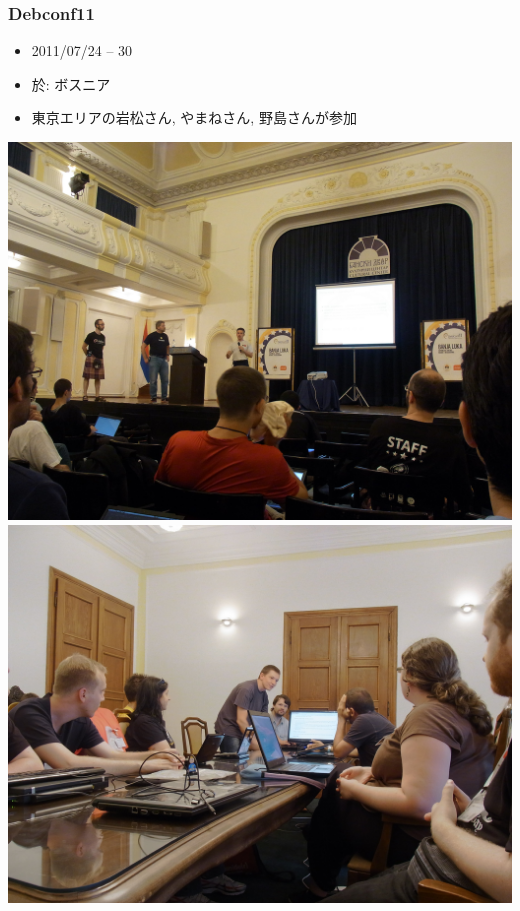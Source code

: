 \documentclass[cjk,dvipdfmx,12pt,%
hyperref={bookmarks=true,bookmarksnumbered=true,bookmarksopen=false,%
colorlinks=false,%
pdftitle={第 50 回 関西 Debian 勉強会},%
pdfauthor={倉敷・のがた・佐々木},%
pdfsubject={資料},%
}]{beamer}
\begin{document}
\begin{frame}[fragile]
  \frametitle{Debconf11}
  \begin{itemize}
  \item 2011/07/24 -- 30
  \item 於: ボスニア
  \item 東京エリアの岩松さん, やまねさん, 野島さんが参加
  \end{itemize}
  \begin{center}
    \includegraphics[height=.45\textheight]{./image201108/debconf11_main.jpg}
    \includegraphics[height=.45\textheight]{./image201108/debconf11_meetingroom.jpg}
  \end{center}
  \centering

\end{frame}
\end{document}
